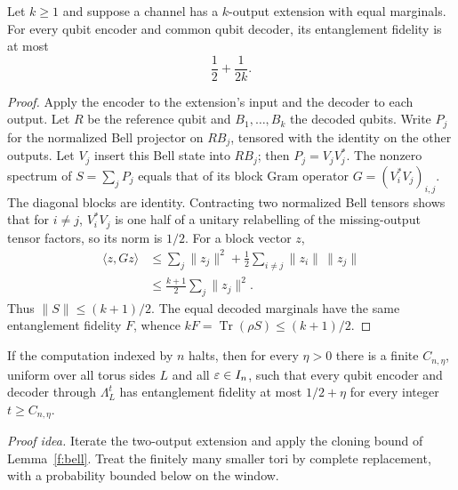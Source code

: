 \begingroup{}
\begin{lemma}\label{f:bell}
Let \(k\ge1\) and suppose a channel has a \(k\)-output extension with equal marginals.
For every qubit encoder and common qubit decoder, its entanglement
fidelity is at most
\[
 \frac12+\frac{1}{2k}.
\]
\end{lemma}
\endgroup
\begin{proof}
Apply the encoder to the extension's input and the decoder to each
output. Let \(R\) be the reference qubit and \(B_1,\ldots,B_k\)
the decoded qubits. Write \(P_j\) for the normalized Bell projector
on \(RB_j\), tensored with the identity on the other outputs.
Let \(V_j\) insert this Bell state into \(RB_j\); then
\(P_j=V_jV_j^*\). The nonzero spectrum of \(S=\sum_jP_j\) equals
that of its block Gram operator \(G=(V_i^*V_j)_{i,j}\).
The diagonal blocks are identity. Contracting two normalized Bell
tensors shows that for \(i\ne j\), \(V_i^*V_j\) is one half of a
unitary relabelling of the missing-output tensor factors, so its norm
is \(1/2\). For a block vector \(z\),
\begin{align*}
 \langle z,Gz\rangle
 &\le\sum_j\|z_j\|^2+
       \frac12\sum_{i\ne j}\|z_i\|\,\|z_j\|\\
 &\le\frac{k+1}{2}\sum_j\|z_j\|^2.
\end{align*}
Thus \(\|S\|\le(k+1)/2\). The equal decoded marginals have the
same entanglement fidelity \(F\), whence
\(kF=\operatorname{Tr}(\rho S)\le(k+1)/2\).
\end{proof}

\begin{theorem}
\label{f:forgetting}
If the computation indexed by \(n\) halts, then for every \(\eta>0\)
there is a finite \(C_{n,\eta}\), uniform over all torus sides \(L\)
and all \(\varepsilon\in I_n\), such that every qubit encoder and decoder
through \(\Lambda_L^t\) has entanglement fidelity at most
\(1/2+\eta\) for every integer \(t\ge C_{n,\eta}\).
\end{theorem}
\par\noindent\emph{Proof idea.} Iterate the two-output extension and apply the cloning bound of Lemma~\ref{f:bell}. Treat the finitely many smaller tori by complete replacement, with a probability bounded below on the window.

